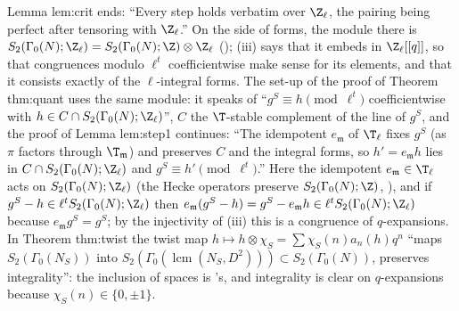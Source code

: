 \begin{paperlink}\label{pl:modforms:crit}
Lemma lem:crit ends: ``Every step holds verbatim over $\Z_\ell$, the pairing being perfect after tensoring with $\Z_\ell$.'' On the side of forms, the module there is
$S_2(\Gamma_0(N);\Z_\ell)=S_2(\Gamma_0(N);\Z)\otimes\Z_\ell$ (); (iii) says that it embeds in $\Z_\ell[[q]]$, so that congruences modulo $\ell^t$
coefficientwise make sense for its elements, and that it consists exactly of the $\ell$-integral forms. The set-up of the proof of Theorem thm:quant uses the same module: it speaks of
``$g^S\equiv h\pmod{\ell^t}$ coefficientwise with $h\in C\cap S_2(\Gamma_0(N);\Z_\ell)$'', $C$ the $\T$-stable complement of the line of $g^S$, and the proof of Lemma lem:step1 continues: ``The idempotent
$e_{\mathfrak m}$ of $\T_\ell$ fixes $g^S$ (as $\pi$ factors through $\T_{\mathfrak m}$) and preserves $C$ and the integral forms, so $h'=e_{\mathfrak m}h$ lies in $C\cap S_2(\Gamma_0(N);\Z_\ell)$ and $g^S\equiv h'\pmod{\ell^t}$.'' Here the idempotent $e_{\mathfrak m}\in\T_\ell$
acts on $S_2(\Gamma_0(N);\Z_\ell)$ (the Hecke operators preserve $S_2(\Gamma_0(N);\Z)$, ), and if $g^S-h\in\ell^tS_2(\Gamma_0(N);\Z_\ell)$ then $e_{\mathfrak m}(g^S-h)=g^S-e_{\mathfrak m}h\in\ell^tS_2(\Gamma_0(N);\Z_\ell)$ because $e_{\mathfrak m}g^S=g^S$; by
the injectivity of (iii) this is a congruence of $q$-expansions. In Theorem thm:twist the twist map $h\mapsto h\otimes\chi_S=\sum\chi_S(n)a_n(h)q^n$ ``maps $S_2(\Gamma_0(N_S))$ into
$S_2(\Gamma_0(\operatorname{lcm}(N_S,D^2)))\subset S_2(\Gamma_0(N))$, preserves integrality'': the inclusion of spaces is 's, and integrality is clear on $q$-expansions because $\chi_S(n)\in\{0,\pm1\}$.
\end{paperlink}

